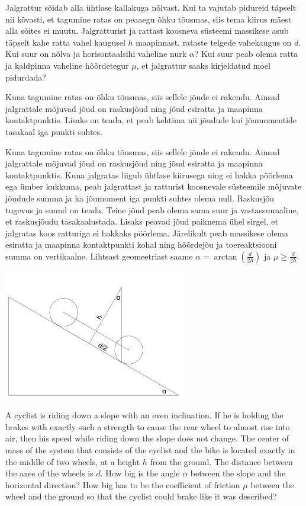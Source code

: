 
Jalgrattur sõidab alla ühtlase kallakuga nõlvast. Kui ta vajutab pidureid täpselt nii kõvasti, et tagumine ratas on peaaegu õhku tõusmas, siis tema kiirus mäest alla sõites ei muutu. Jalgratturist ja rattast koosneva süsteemi massikese asub täpselt kahe ratta vahel kaugusel $h$ maapinnast, rataste telgede vahekaugus on $d$. Kui suur on nõlva ja horisontaalsihi vaheline nurk $\alpha$? Kui suur peab olema ratta ja kaldpinna vaheline hõõrdetegur $\mu$, et jalgrattur saaks kirjeldatud moel pidurdada?

\hint
Kuna tagumine ratas on õhku tõusmas, siis sellele jõude ei rakendu. Ainsad jalgrattale mõjuvad jõud on raskusjõud ning jõud esiratta ja maapinna kontaktpunktis. Lisaks on teada, et peab kehtima nii jõudude kui jõumomentide tasakaal iga punkti suhtes.

\solu
Kuna tagumine ratas on õhku tõusmas, siis sellele jõude ei rakendu. Ainsad jalgrattale mõjuvad jõud on raskusjõud ning jõud esiratta ja maapinna kontaktpunktis. Kuna jalgratas liigub ühtlase kiirusega ning ei hakka pöörlema ega ümber kukkuma, peab jalgrattast ja ratturist koosnevale süsteemile mõjuvate jõudude summa ja ka jõumoment iga punkti suhtes olema null. Raskusjõu tugevus ja suund on teada. Teine jõud peab olema sama suur ja vastassuunaline, et raskusjõudu tasakaalustada. Lisaks peavad jõud paiknema ühel sirgel, et jalgratas koos ratturiga ei hakkaks pöörlema. Järelikult peab massikese olema esiratta ja maapinna kontaktpunkti kohal ning hõõrdejõu ja toereaktsiooni summa on vertikaalne. Lihtsast geomeetriast saame $\alpha=\arctan(\frac{d}{2h})$ ja $\mu\ge\frac{d}{2h}$.
\begin{center}
\includegraphics[width=0.6\textwidth]{2014-lahg-08-ratas}
\end{center}

A cyclist is riding down a slope with an even inclination. If he is holding the brakes with exactly such a strength to cause the rear wheel to almost rise into air, then his speed while riding down the slope does not change. The center of mass of the system that consists of the cyclist and the bike is located exactly in the middle of two wheels, at a height $h$ from the ground. The distance between the axes of the wheels is $d$. How big is the angle $\alpha$ between the slope and the horizontal direction? How big has to be the coefficient of friction $\mu$ between the wheel and the ground so that the cyclist could brake like it was described?

